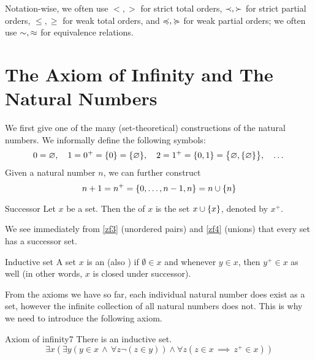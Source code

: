 \documentclass{styles/tufte}
\begin{document}
  Notation-wise, we often use $<, >$ for strict total orders, $\prec, \succ$ for strict partial orders, $\leq, \geq$ for weak total orders, and $\preccurlyeq, \succcurlyeq$ for weak partial orders; we often use $\sim, \approx$ for equivalence relations.



\section{The Axiom of Infinity and The Natural Numbers}

We first give one of the many (set-theoretical) constructions of the natural numbers. We informally define the following symbols:
\[ 0 = \emptyset, \quad 1 = 0^+ = \set{0} = \set{\emptyset}, \quad 2 = 1^+ = \set{0, 1} = \set{\emptyset, \set{\emptyset}}, \quad\dots \]
Given a natural number $n$, we can further construct
\[ n + 1 = n^+ = \set{0, \dots, n - 1, n} = n \cup \set{n} \]

\begin{definition}{Successor}{}
  Let $x$ be a set. Then the  of $x$ is the set $x \cup \set{x}$, denoted by $x^+$.
\end{definition}

We see immediately from \cref{zf3} (unordered pairs) and \cref{zf4} (unions) that every set has a successor set.

\begin{definition}{Inductive set}{}
  A set $x$ is an  (also ) if $\emptyset \in x$ and whenever $y \in x$, then $y^+ \in x$ as well (in other words, $x$ is closed under successor).
\end{definition}

From the axioms we have so far, each individual natural number does exist as a set, however the infinite collection of all natural numbers does not. This is why we need to introduce the following axiom.

\begin{zf}{Axiom of infinity}{7}
  There is an inductive set.
  \[ \exists x (\exists y (y \in x \,\land\, \forall z \neg(z \in y)) \land \forall z (z \in x \,\implies\, z^+\! \in x)) \]
\end{zf}
\end{document}

